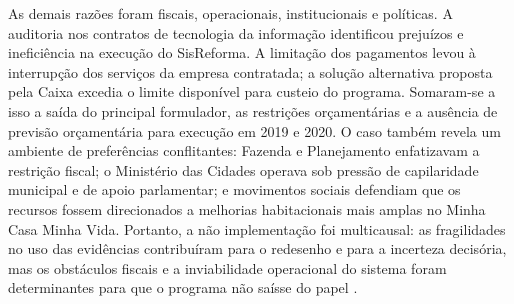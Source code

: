 \documentclass[12pt,a4paper]{article}
\begin{document}
As demais razões foram fiscais, operacionais, institucionais e políticas. A auditoria nos contratos de tecnologia da informação identificou prejuízos e ineficiência na execução do SisReforma. A limitação dos pagamentos levou à interrupção dos serviços da empresa contratada; a solução alternativa proposta pela Caixa excedia o limite disponível para custeio do programa. Somaram-se a isso a saída do principal formulador, as restrições orçamentárias e a ausência de previsão orçamentária para execução em 2019 e 2020. O caso também revela um ambiente de preferências conflitantes: Fazenda e Planejamento enfatizavam a restrição fiscal; o Ministério das Cidades operava sob pressão de capilaridade municipal e de apoio parlamentar; e movimentos sociais defendiam que os recursos fossem direcionados a melhorias habitacionais mais amplas no Minha Casa Minha Vida. Portanto, a não implementação foi multicausal: as fragilidades no uso das evidências contribuíram para o redesenho e para a incerteza decisória, mas os obstáculos fiscais e a inviabilidade operacional do sistema foram determinantes para que o programa não saísse do papel \parencite[p. 98]{santos2020cartao}.

\printbibliography[title={Referências}]
\end{document}
